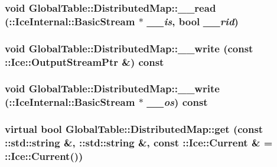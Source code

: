 \label{class_global_table_1_1_distributed_map_aad7fc00a443c0ded6693678f41683892}
\hypertarget{class_global_table_1_1_distributed_map_a077b9be47f7dd5a4b4e2ff72ece9b7bc}{
\subsubsection[{\_\-\_\-read}]{\setlength{\rightskip}{0pt plus 5cm}void GlobalTable::DistributedMap::\_\-\_\-read (::IceInternal::BasicStream $\ast$ {\em \_\-\_\-is}, \/  bool {\em \_\-\_\-rid})}}
\label{class_global_table_1_1_distributed_map_a077b9be47f7dd5a4b4e2ff72ece9b7bc}
\hypertarget{class_global_table_1_1_distributed_map_a862fa3febeee2772f21a144f35d97fd5}{
\subsubsection[{\_\-\_\-write}]{\setlength{\rightskip}{0pt plus 5cm}void GlobalTable::DistributedMap::\_\-\_\-write (const ::Ice::OutputStreamPtr \&) const}}
\label{class_global_table_1_1_distributed_map_a862fa3febeee2772f21a144f35d97fd5}
\hypertarget{class_global_table_1_1_distributed_map_a9965a47daa0af75e64fd2f1428f94d5a}{
\subsubsection[{\_\-\_\-write}]{\setlength{\rightskip}{0pt plus 5cm}void GlobalTable::DistributedMap::\_\-\_\-write (::IceInternal::BasicStream $\ast$ {\em \_\-\_\-os}) const}}
\label{class_global_table_1_1_distributed_map_a9965a47daa0af75e64fd2f1428f94d5a}
\hypertarget{class_global_table_1_1_distributed_map_a5a434538e73a409df08c2c37829b77ef}{
\subsubsection[{get}]{\setlength{\rightskip}{0pt plus 5cm}virtual bool GlobalTable::DistributedMap::get (const ::std::string \&, \/  ::std::string \&, \/  const ::Ice::Current \& = {\ttfamily ::Ice::Current()})}}
